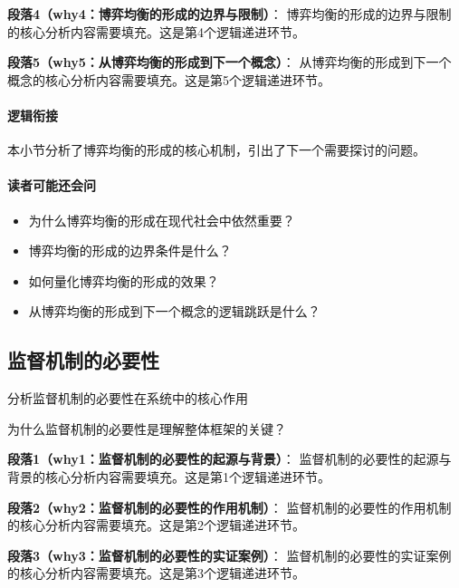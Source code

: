 \documentclass[../main.tex]{subfiles}
\begin{document}
{{\textbf{段落4（why4：博弈均衡的形成的边界与限制）}：
博弈均衡的形成的边界与限制的核心分析内容需要填充。这是第4个逻辑递进环节。


\textbf{段落5（why5：从博弈均衡的形成到下一个概念）}：
从博弈均衡的形成到下一个概念的核心分析内容需要填充。这是第5个逻辑递进环节。


\paragraph*{逻辑衔接}
本小节分析了博弈均衡的形成的核心机制，引出了下一个需要探讨的问题。

\paragraph*{读者可能还会问}
\begin{itemize}
\item 为什么博弈均衡的形成在现代社会中依然重要？
\item 博弈均衡的形成的边界条件是什么？
\item 如何量化博弈均衡的形成的效果？
\item 从博弈均衡的形成到下一个概念的逻辑跳跃是什么？
\end{itemize}


\subsection{监督机制的必要性}

\begin{motivation}
分析监督机制的必要性在系统中的核心作用
\end{motivation}

\begin{logicmap}
[逻辑链占位]
\end{logicmap}

\begin{questionbox}
为什么监督机制的必要性是理解整体框架的关键？
\end{questionbox}

\textbf{段落1（why1：监督机制的必要性的起源与背景）}：
监督机制的必要性的起源与背景的核心分析内容需要填充。这是第1个逻辑递进环节。


\textbf{段落2（why2：监督机制的必要性的作用机制）}：
监督机制的必要性的作用机制的核心分析内容需要填充。这是第2个逻辑递进环节。


\textbf{段落3（why3：监督机制的必要性的实证案例）}：
监督机制的必要性的实证案例的核心分析内容需要填充。这是第3个逻辑递进环节。


}}
\end{document}
